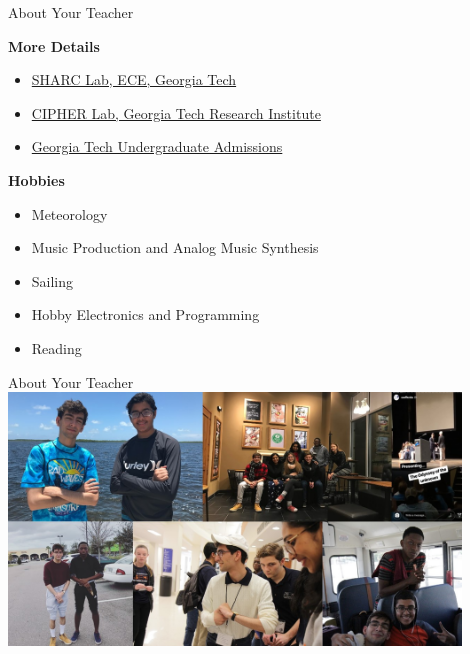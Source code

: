 \documentclass[aspectratio=169]{beamer}
\begin{document}
\begin{frame}{About Your Teacher}

    \textbf{More Details}
    \begin{itemize}
        \item \href{https://sharclab.ece.gatech.edu/}{SHARC Lab, ECE, Georgia Tech}
        \item \href{https://www.gtri.gatech.edu/laboratories/cybersecurity-information-protection-and-hardware-evaluation-research}{CIPHER Lab, Georgia Tech Research Institute}
        \item \href{https://admission.gatech.edu/}{Georgia Tech Undergraduate Admissions}
    \end{itemize}

    \vspace{\baselineskip}

    \textbf{Hobbies}
    \begin{itemize}
        \item Meteorology
        \item Music Production and Analog Music Synthesis
        \item Sailing
        \item Hobby Electronics and Programming
        \item Reading
    \end{itemize}

\end{frame}

\begin{frame}{About Your Teacher}
    \centering
    \includegraphics[width=0.9\textwidth]{imgs/me_3.jpg}
\end{frame}
\end{document}
